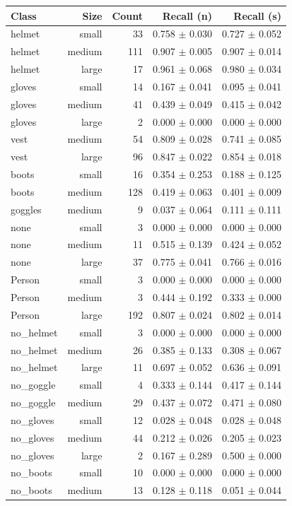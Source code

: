\begin{tabular}{lrrrr}
\toprule
Class & Size & Count & Recall (n) & Recall (s) \\
\midrule
helmet & small & 33 & 0.758 $\pm$ 0.030 & 0.727 $\pm$ 0.052 \\
helmet & medium & 111 & 0.907 $\pm$ 0.005 & 0.907 $\pm$ 0.014 \\
helmet & large & 17 & 0.961 $\pm$ 0.068 & 0.980 $\pm$ 0.034 \\
gloves & small & 14 & 0.167 $\pm$ 0.041 & 0.095 $\pm$ 0.041 \\
gloves & medium & 41 & 0.439 $\pm$ 0.049 & 0.415 $\pm$ 0.042 \\
gloves & large & 2 & 0.000 $\pm$ 0.000 & 0.000 $\pm$ 0.000 \\
vest & medium & 54 & 0.809 $\pm$ 0.028 & 0.741 $\pm$ 0.085 \\
vest & large & 96 & 0.847 $\pm$ 0.022 & 0.854 $\pm$ 0.018 \\
boots & small & 16 & 0.354 $\pm$ 0.253 & 0.188 $\pm$ 0.125 \\
boots & medium & 128 & 0.419 $\pm$ 0.063 & 0.401 $\pm$ 0.009 \\
goggles & medium & 9 & 0.037 $\pm$ 0.064 & 0.111 $\pm$ 0.111 \\
none & small & 3 & 0.000 $\pm$ 0.000 & 0.000 $\pm$ 0.000 \\
none & medium & 11 & 0.515 $\pm$ 0.139 & 0.424 $\pm$ 0.052 \\
none & large & 37 & 0.775 $\pm$ 0.041 & 0.766 $\pm$ 0.016 \\
Person & small & 3 & 0.000 $\pm$ 0.000 & 0.000 $\pm$ 0.000 \\
Person & medium & 3 & 0.444 $\pm$ 0.192 & 0.333 $\pm$ 0.000 \\
Person & large & 192 & 0.807 $\pm$ 0.024 & 0.802 $\pm$ 0.014 \\
no\_helmet & small & 3 & 0.000 $\pm$ 0.000 & 0.000 $\pm$ 0.000 \\
no\_helmet & medium & 26 & 0.385 $\pm$ 0.133 & 0.308 $\pm$ 0.067 \\
no\_helmet & large & 11 & 0.697 $\pm$ 0.052 & 0.636 $\pm$ 0.091 \\
no\_goggle & small & 4 & 0.333 $\pm$ 0.144 & 0.417 $\pm$ 0.144 \\
no\_goggle & medium & 29 & 0.437 $\pm$ 0.072 & 0.471 $\pm$ 0.080 \\
no\_gloves & small & 12 & 0.028 $\pm$ 0.048 & 0.028 $\pm$ 0.048 \\
no\_gloves & medium & 44 & 0.212 $\pm$ 0.026 & 0.205 $\pm$ 0.023 \\
no\_gloves & large & 2 & 0.167 $\pm$ 0.289 & 0.500 $\pm$ 0.000 \\
no\_boots & small & 10 & 0.000 $\pm$ 0.000 & 0.000 $\pm$ 0.000 \\
no\_boots & medium & 13 & 0.128 $\pm$ 0.118 & 0.051 $\pm$ 0.044 \\
\bottomrule
\end{tabular}
